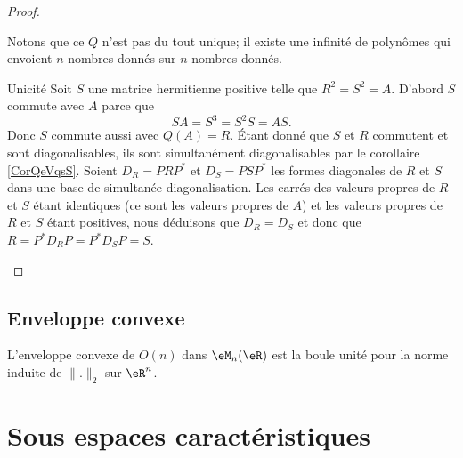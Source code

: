 \begin{proof}
\begin{subproof}
        Notons que ce \( Q\) n'est pas du tout unique; il existe une infinité de polynômes qui envoient \( n\) nombres donnés sur \( n\) nombres donnés.

    \item[Unicité]
        Soit \( S\) une matrice hermitienne positive telle que \( R^2=S^2=A\). D'abord \( S\) commute avec \( A\) parce que
        \begin{equation}
            SA=S^3=S^2S=AS.
        \end{equation}
        Donc \( S\) commute aussi avec \( Q(A)=R\). Étant donné que \( S\) et \( R\) commutent et sont diagonalisables, ils sont simultanément diagonalisables par le corollaire \ref{CorQeVqsS}. Soient \( D_R=PRP^*\) et \( D_S=PSP^*\) les formes diagonales de \( R\) et \( S\) dans une base de simultanée diagonalisation. Les carrés des valeurs propres de \( R\) et \( S\) étant identiques (ce sont les valeurs propres de \( A\)) et les valeurs propres de \( R\) et \( S\) étant positives, nous déduisons que \( D_R=D_S\) et donc que \( R=P^*D_RP=P^*D_SP=S\).
    \end{subproof}
\end{proof}

\subsection{Enveloppe convexe}

\begin{theorem}
    L'enveloppe convexe de \( O(n)\) dans \( \eM_n(\eR)\) est la boule unité pour la norme induite de \( \| . \|_2\) sur \( \eR^n\).
\end{theorem}

\section{Sous espaces caractéristiques}


